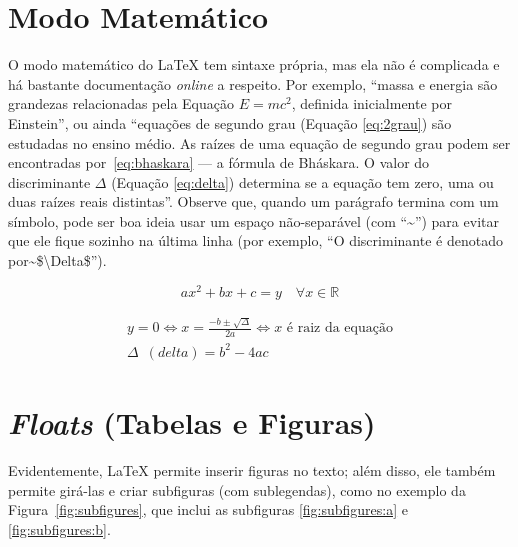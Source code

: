 \section{Modo Matemático}

O modo matemático do \LaTeX{} tem sintaxe própria, mas ela não é complicada e
há bastante documentação \emph{online} a respeito. Por exemplo, ``massa e
energia são grandezas relacionadas pela Equação $E=mc^2$, definida inicialmente
por Einstein'', ou ainda ``equações de segundo grau (Equação \ref{eq:2grau})
são estudadas no ensino médio. As raízes de uma equação de segundo grau podem
ser encontradas por~\eqref{eq:bhaskara} --- a fórmula de Bháskara.
O valor do discriminante $\Delta$ (Equação \ref{eq:delta}) determina se a
equação tem zero, uma ou duas raízes reais distintas''. Observe que, quando um
parágrafo termina com um símbolo, pode ser boa ideia usar um espaço
não-separável (com ``\textsf{\textasciitilde}'') para evitar que ele
fique sozinho na última linha (por exemplo, ``\textsf{O discriminante é
denotado por\textasciitilde{}\$\textbackslash{}Delta\$}'').\label{orphanchar}

\begin{equation}
  \label{eq:2grau}
  ax^2+bx+c=y \quad \forall x \in \mathbb{R}
\end{equation}

\begin{gather}
  \label{eq:bhaskara}
    y=0 \Leftrightarrow x=\frac{-b \pm \sqrt{\Delta}}{2a}
    \Leftrightarrow x \text{ é raiz da equação}\\
  \label{eq:delta}
    \Delta\enspace(\mathit{delta}) = b^2-4ac
\end{gather}

\section{\emph{Floats} (Tabelas e Figuras)}

Evidentemente, \LaTeX{} permite inserir figuras no texto; além disso, ele
também permite girá-las e criar subfiguras (com sublegendas),
como no exemplo da Figura~\ref{fig:subfigures}, que inclui
as subfiguras \ref{fig:subfigures:a} e \ref{fig:subfigures:b}.


